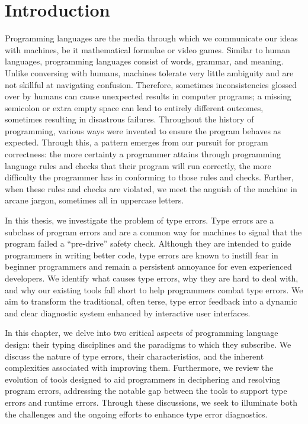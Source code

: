 
\chapter{Introduction}

\label{chap:introduction} 

\graphicspath{{Figures/Introduction}}

Programming languages are the media through which we communicate our ideas with machines, be it mathematical formulae or video games. Similar to human languages, programming languages consist of words, grammar, and meaning. Unlike conversing with humans, machines tolerate very little ambiguity and are not skillful at navigating confusion. Therefore, sometimes inconsistencies glossed over by humans can cause unexpected results in computer programs; a missing semicolon or extra empty space can lead to entirely different outcomes, sometimes resulting in disastrous failures. Throughout the history of programming, various ways were invented to ensure the program behaves as expected. Through this, a pattern emerges from our pursuit for program correctness: the more certainty a programmer attains through programming language rules and checks that their program will run correctly, the more difficulty the programmer has in conforming to those rules and checks. Further, when these rules and checks are violated, we meet the anguish of the machine in arcane jargon, sometimes all in uppercase letters.

In this thesis, we investigate the problem of type errors. Type errors are a subclass of program errors and are a common way for machines to signal that the program failed a ``pre-drive'' safety check. Although they are intended to guide programmers in writing better code, type errors are known to instill fear in beginner programmers and remain a persistent annoyance for even experienced developers. We identify what causes type errors, why they are hard to deal with, and why our existing tools fall short to help programmers combat type errors. We aim to transform the traditional, often terse, type error feedback into a dynamic and clear diagnostic system enhanced by interactive user interfaces. 


In this chapter, we delve into two critical aspects of programming language design: their typing disciplines and the paradigms to which they subscribe. We discuss the nature of type errors, their characteristics, and the inherent complexities associated with improving them. Furthermore, we review the evolution of tools designed to aid programmers in deciphering and resolving program errors, addressing the notable gap between the tools to support type errors and runtime errors. Through these discussions, we seek to illuminate both the challenges and the ongoing efforts to enhance type error diagnostics.

